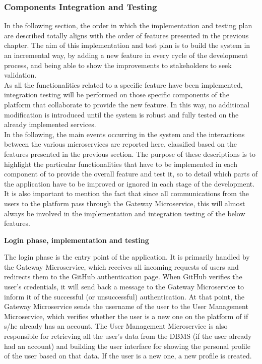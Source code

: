 \subsubsection{Components Integration and Testing}


In the following section, the order in which the implementation and testing plan are described totally aligns with the order of features presented in the previous chapter.
The aim of this implementation and test plan is to build the \app system in an incremental way, by adding a new feature in every cycle of the development process, and being able to show the improvements to stakeholders to seek validation.\\
As all the functionalities related to a specific feature have been implemented, integration testing will be performed on those specific components of the \app platform that collaborate to provide the new feature. In this way, no additional modification is introduced until the system is robust and fully tested on the already implemented services.\\
In the following, the main events occurring in the system and the interactions between the various microservices are reported here, classified based on the features presented in the previous section. The purpose of these descriptions is to highlight the particular functionalities that have to be implemented in each component of \app to provide the overall feature and test it, so to detail which parts of the application have to be improved or ignored in each stage of the development.\\
It is also important to mention the fact that since all communications from the users to the \app platform pass through the Gateway Microservice, this will almost always be involved in the implementation and integration testing of the below features.

\vspace{0.7cm}

\textbf{Login phase, implementation and testing}

The login phase is the entry point of the application. It is primarily handled by the Gateway Microservice, which receives all incoming requests of users and redirects them to the GitHub authentication page. When GitHub verifies the user's credentials, it will send back a message to the Gateway Microservice to inform it of the successful (or unsuccessful) authentication. At that point, the Gateway Microservice sends the username of the user to the User Management Microservice, which verifies whether the user is a new one on the platform of if s/he already has an account. 
The User Management Microservice is also responsible for retrieving all the user's data from the DBMS (if the user already had an account) and building the user interface for showing the personal profile of the user based on that data. If the user is a new one, a new profile is created.

